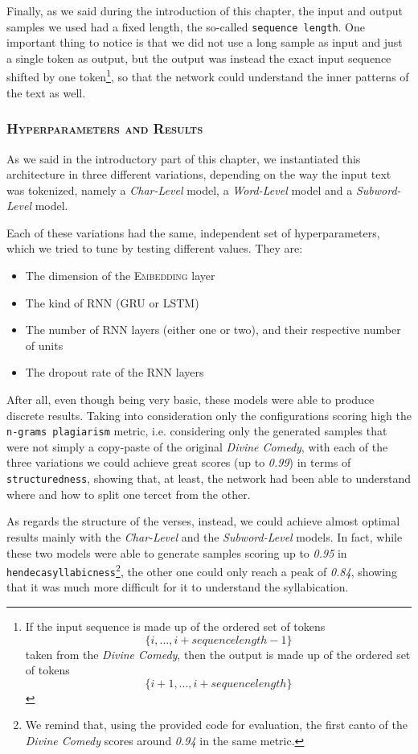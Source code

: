 Finally, as we said during the introduction of this chapter, the input and output samples we used had a fixed length, the so-called \texttt{sequence length}.
One important thing to notice is that we did not use a long sample as input and just a single token as output, but the output was instead the exact input sequence shifted by one token\footnote{
    If the input sequence is made up of the ordered set of tokens $$\{i, ..., i + sequence length - 1\}$$ taken from the \textit{Divine Comedy}, then the output is made up of the ordered set of tokens $$\{i + 1, ..., i + sequence length\}$$
}, so that the network could understand the inner patterns of the text as well.

\subsubsection{\textsc{Hyperparameters and Results}}

As we said in the introductory part of this chapter, we instantiated this architecture in three different variations, depending on the way the input text was tokenized, namely a \textit{Char-Level} model, a \textit{Word-Level} model and a \textit{Subword-Level} model.

Each of these variations had the same, independent set of hyperparameters, which we tried to tune by testing different values.
They are:
\begin{itemize}
    \item The dimension of the \textsc{Embedding} layer
    \item The kind of \textsc{RNN} (\textsc{GRU} or \textsc{LSTM})
    \item The number of \textsc{RNN} layers (either one or two), and their respective number of units
    \item The dropout rate of the \textsc{RNN} layers
\end{itemize}

After all, even though being very basic, these models were able to produce discrete results.
Taking into consideration only the configurations scoring high the \texttt{n-grams plagiarism} metric, i.e. considering only the generated samples that were not simply a copy-paste of the original \textit{Divine Comedy}, with each of the three variations we could achieve great scores (up to \textit{0.99}) in terms of \texttt{structuredness}, showing that, at least, the network had been able to understand where and how to split one tercet from the other.

As regards the structure of the verses, instead, we could achieve almost optimal results mainly with the \textit{Char-Level} and the \textit{Subword-Level} models.
In fact, while these two models were able to generate samples scoring up to \textit{0.95} in \texttt{hendecasyllabicness}\footnote{
    We remind that, using the provided code for evaluation, the first canto of the \textit{Divine Comedy} scores around \textit{0.94} in the same metric.
}, the other one could only reach a peak of \textit{0.84}, showing that it was much more difficult for it to understand the syllabication.

